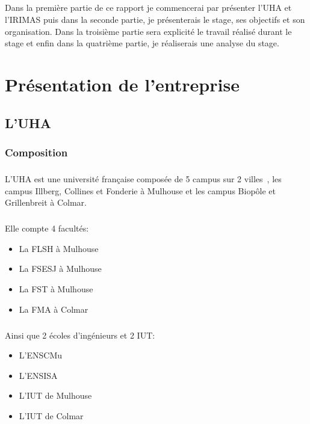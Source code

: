 \documentclass[a4paper,11pt,twoside,french,report]{../common/simplem}
\begin{document}
		\paragraph*{}
			Dans la première partie de ce rapport je commencerai par présenter l'\gls{UHA} et l'\gls{IRIMAS} puis dans la seconde partie, je présenterais le stage, ses objectifs et son organisation. Dans la troisième partie sera explicité le travail réalisé durant le stage et enfin dans la quatrième partie, je réaliserais une analyse du stage.
	\chapter{Présentation de l'entreprise}
		\section{L'\acrshort{UHA}}
			\subsection{Composition}
				\paragraph*{}
					L'\gls{UHA} est une université française composée de 5 campus sur 2 villes~\cite{UHA_Organisation}, les campus Illberg, Collines et Fonderie à Mulhouse et les campus Biopôle et Grillenbreit à Colmar.
				\paragraph*{}
					Elle compte 4 facultés:
					\begin{itemize}
						\item La \gls{FLSH} à Mulhouse
						\item La \gls{FSESJ} à Mulhouse
						\item La \gls{FST} à Mulhouse
						\item La \gls{FMA} à Colmar
					\end{itemize}
				\paragraph*{}
					Ainsi que 2 écoles d'ingénieurs et 2 \gls{IUT}:
					\begin{itemize}
						\item L'\gls{ENSCMu}
						\item L'\gls{ENSISA}
						\item L'\gls{IUT} de Mulhouse
						\item L'\gls{IUT} de Colmar
					\end{itemize}
\end{document}
